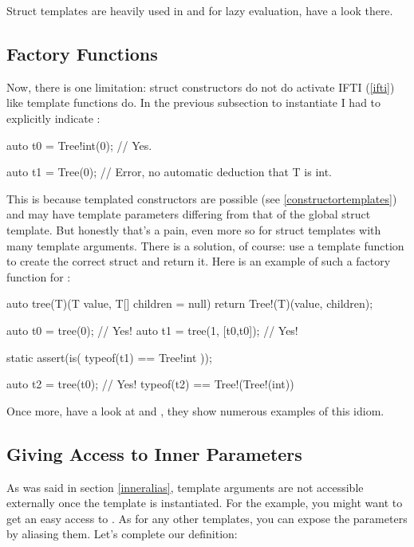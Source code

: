 Struct templates are heavily used in  and  for lazy evaluation, have a look there.

\subsection{Factory Functions}\label{factory}

Now, there is one limitation: struct constructors do not do activate IFTI (\ref{ifti}) like template functions do. In the previous subsection to instantiate  I had to explicitly indicate :

\begin{dcode}
auto t0 = Tree!int(0); // Yes.

auto t1 = Tree(0); // Error, no automatic deduction that T is int.
\end{dcode}

This is because templated constructors are possible (see \ref{constructortemplates}) and may have template parameters differing from that of the global struct template. But honestly that's a pain, even more so for struct templates with many template arguments. There is a solution, of course: use a template function to create the correct struct and return it. Here is an example of such a factory function for :

\begin{dcode}
auto tree(T)(T value, T[] children = null) 
{
    return Tree!(T)(value, children);
}

auto t0 = tree(0); // Yes!
auto t1 = tree(1, [t0,t0]); // Yes!

static assert(is( typeof(t1) == Tree!int ));

auto t2 = tree(t0); // Yes! typeof(t2) == Tree!(Tree!(int)) 
\end{dcode}

Once more, have a look at  and , they show numerous examples of this idiom.

\subsection{Giving Access to Inner Parameters}\label{givingaccess}

As was said in section \ref{inneralias}, template arguments are not accessible externally once the template is instantiated. For the  example, you might want to get an easy access to . As for any other templates, you can expose the parameters by aliasing them. Let's complete our  definition:

